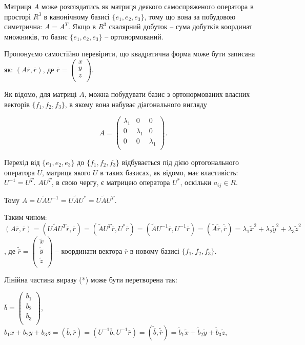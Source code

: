 Матриця $A$ може розглядатись як матриця деякого самоспряженого
оператора в просторі $R^3$ в канонічному базисі $\{e_1, e_2, e_3\}$, тому що вона за
побудовою симетрична: $A = A^T$. Якщо в $R^3$ скалярний добуток -- сума
добутків координат множників, то базис $\{e_1, e_2, e_3\}$ -- ортонормований.

Пропонуємо самостійно перевірити, що квадратична форма може бути
записана як: $(A \overline{r}, \overline{r})$, де $\overline{r} = \begin{pmatrix}
	x \\
	y \\
	z \\
\end{pmatrix}$.

Як відомо, для матриці $A$, можна побудувати базис з ортонормованих
власних векторів $\{f_1, f_2, f_3\}$, в якому вона набуває діагонального вигляду

$$A = \begin{pmatrix}
	\lambda_1 & 0 & 0 \\
	0 & \lambda_1 & 0 \\
	0 & 0 & \lambda_1 \\
\end{pmatrix}.$$

Перехід від $\{e_1, e_2, e_3\}$ до $\{f_1, f_2, f_3\}$ відбувається під дією ортогонального
оператора $U$, матриця якого $U$ в таких базисах, як відомо, має властивість:
$U^{-1} = U^T$. $A U^T$, в свою чергу, є матрицею оператора $U^*$, оскільки $a_{ij} \in R$.

Тому $A = U \tilde{A} U^{-1} = U \tilde{A} U^* = U \tilde{A} U^T$.

Таким чином: $(A \overline{r}, \overline{r}) = (U \tilde{A} U^T \overline{r}, \overline{r})
= (\tilde{A} U^T \overline{r}, U^* \overline{r}) = (\tilde{A} U^{-1} \overline{r}, U^{-1} \overline{r})
= (\tilde{A} \tilde{\overline{r}}, \tilde{\overline{r}}) = \lambda_1 \tilde{x}^2 + \lambda_2 \tilde{y}^2 + \lambda_3 \tilde{z}^2$,
де $\tilde{\overline{r}} = \begin{pmatrix}
	\tilde{x} \\
	\tilde{y} \\
	\tilde{z} \\
\end{pmatrix}$ -- координати вектора $\overline{r}$ в новому
базисі $\{f_1, f_2, f_3\}$.

Лінійна частина виразу (*) може бути перетворена так:

$\overline{b} = \begin{pmatrix}
	b_1 \\
	b_2 \\
	b_3 \\
\end{pmatrix}$, $b_1 x + b_2 y + b_3 z = (\overline{b}, \overline{r})
= (U^{-1} \overline{b}, U^{-1} \overline{r}) = (\tilde{\overline{b}},\tilde{\overline{r}})
= \tilde{b}_1 \tilde{x} + \tilde{b}_2 \tilde{y} + \tilde{b}_3 \tilde{z}$,

